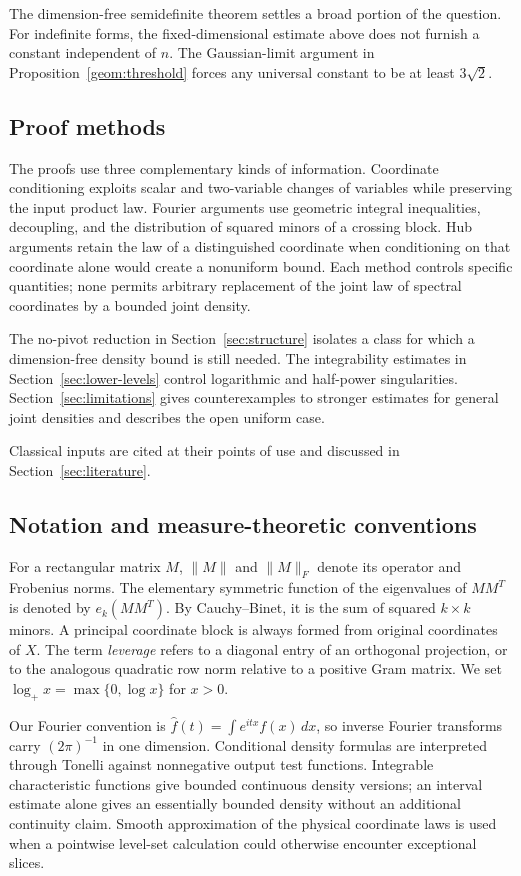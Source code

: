 \documentclass[11pt]{article}
\theoremstyle{definition}
\theoremstyle{remark}
\begin{document}
The dimension-free semidefinite theorem settles a broad portion of the question. For indefinite forms, the fixed-dimensional estimate above does not furnish a constant independent of $n$. The Gaussian-limit argument in Proposition~\ref{geom:threshold} forces any universal constant to be at least $3\sqrt2$.

\subsection{Proof methods}

The proofs use three complementary kinds of information. Coordinate conditioning exploits scalar and two-variable changes of variables while preserving the input product law. Fourier arguments use geometric integral inequalities, decoupling, and the distribution of squared minors of a crossing block. Hub arguments retain the law of a distinguished coordinate when conditioning on that coordinate alone would create a nonuniform bound. Each method controls specific quantities; none permits arbitrary replacement of the joint law of spectral coordinates by a bounded joint density.

The no-pivot reduction in Section~\ref{sec:structure} isolates a class for which a dimension-free density bound is still needed. The integrability estimates in Section~\ref{sec:lower-levels} control logarithmic and half-power singularities. Section~\ref{sec:limitations} gives counterexamples to stronger estimates for general joint densities and describes the open uniform case.

Classical inputs are cited at their points of use and discussed in Section~\ref{sec:literature}.

\subsection{Notation and measure-theoretic conventions}

For a rectangular matrix $M$, $\|M\|$ and $\|M\|_F$ denote its operator and Frobenius norms. The elementary symmetric function of the eigenvalues of $MM^T$ is denoted by $e_k(MM^T)$. By Cauchy--Binet, it is the sum of squared $k\times k$ minors. A principal coordinate block is always formed from original coordinates of $X$. The term \emph{leverage} refers to a diagonal entry of an orthogonal projection, or to the analogous quadratic row norm relative to a positive Gram matrix. We set $\log_+x=\max\{0,\log x\}$ for $x>0$.

Our Fourier convention is $\widehat f(t)=\int e^{itx}f(x)\,dx$, so inverse Fourier transforms carry $(2\pi)^{-1}$ in one dimension. Conditional density formulas are interpreted through Tonelli against nonnegative output test functions. Integrable characteristic functions give bounded continuous density versions; an interval estimate alone gives an essentially bounded density without an additional continuity claim. Smooth approximation of the physical coordinate laws is used when a pointwise level-set calculation could otherwise encounter exceptional slices.
\end{document}

